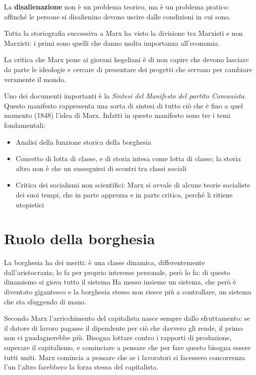 \documentclass[a4paper, twoside, titlepage]{book}
\begin{document}
La \textbf{disalienazione} non è un problema teorico, ma è un problema pratico: affinché le persone si disalienino devono uscire dalle condizioni in cui sono.

Tutta la storiografia successiva a Marx ha visto la divisione tra Marxisti e non Marxisti: i primi sono quelli che danno molta importanza all’economia.

La critica che Marx pone ai giovani hegeliani è di non capire che devono lasciare da parte le ideologie e cercare di presentare dei progetti che servano per cambiare veramente il mondo.

Uno dei documenti importanti è la \textit{Sintesi del Manifesto del partito Comunista}. Questo manifesto rappresenta una sorta di sintesi di tutto ciò che è fino a quel momento (1848) l’idea di Marx. Infatti in questo manifesto sono tre i temi fondamentali:
\begin{itemize}
\item Analisi della funzione storica della borghesia
\item Concetto di lotta di classe, e di storia intesa come lotta di classe; la storia altro non è che un susseguirsi di scontri tra classi sociali
\item Critica dei socialismi non scientifici: Marx si avvale di alcune teorie socialiste dei suoi tempi, che in parte apprezza e in parte critica, perché li ritiene utopistici
\end{itemize}

\chapter{Ruolo della borghesia}

La borghesia ha dei meriti: è una classe dinamica, differentemente dall’aristocrazia; lo fa per proprio interesse personale, però lo fa: di questo dinamismo si giova tutto il sistema
Ha messo insieme un sistema, che però è diventato gigantesco e la borghesia stesso non riesce più a controllare, un sistema che sta sfuggendo di mano.

Secondo Marx l’arricchimento del capitalista nasce sempre dallo sfruttamento: se il datore di lavoro pagasse il dipendente per ciò che davvero gli rende, il primo non ci guadagnerebbe più.
Bisogna lottare contro i rapporti di produzione, superare il capitalismo, e cominciare a pensare che per fare questo bisogna essere tutti uniti.
Marx comincia a pensare che se i lavoratori si facessero concorrenza l’un l’altro farebbero la forza stessa del capitalista.
\end{document}
